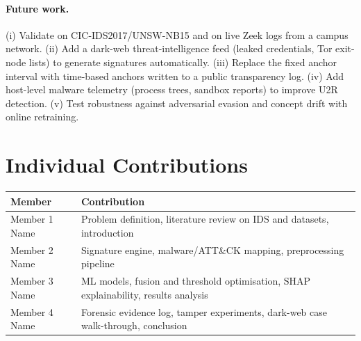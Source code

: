\documentclass[12pt,a4paper,oneside]{article}
\newcommand{\memberA}{Member 1 Name}    \newcommand{\prnA}{PRN}
\newcommand{\memberB}{Member 2 Name}    \newcommand{\prnB}{PRN}
\newcommand{\memberC}{Member 3 Name}    \newcommand{\prnC}{PRN}
\newcommand{\memberD}{Member 4 Name}    \newcommand{\prnD}{PRN}
\begin{document}
\paragraph{Future work.}
(i) Validate on CIC-IDS2017/UNSW-NB15 and on live Zeek logs from a campus network.
(ii) Add a dark-web threat-intelligence feed (leaked credentials, Tor exit-node lists) to generate signatures automatically.
(iii) Replace the fixed anchor interval with time-based anchors written to a public transparency log.
(iv) Add host-level malware telemetry (process trees, sandbox reports) to improve U2R detection.
(v) Test robustness against adversarial evasion and concept drift with online retraining.

\section*{\color{rblue}Individual Contributions}
\begin{table}[H]\centering\small
\begin{tabularx}{\linewidth}{l Y}
\toprule
\textcolor{rblue}{Member} & \textcolor{rblue}{Contribution} \\ \midrule
\memberA & Problem definition, literature review on IDS and datasets, introduction \\
\memberB & Signature engine, malware/ATT\&CK mapping, preprocessing pipeline \\
\memberC & ML models, fusion and threshold optimisation, SHAP explainability, results analysis \\
\memberD & Forensic evidence log, tamper experiments, dark-web case walk-through, conclusion \\
\bottomrule
\end{tabularx}
\end{table}
\end{document}
